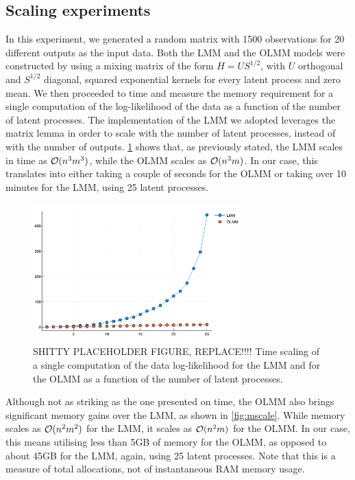 \documentclass{article}
\begin{document}
\subsection{Scaling experiments}
\label{subsec:scaling}

In this experiment, we generated a random matrix with 1500 observations for 20 different outputs as the input data.
Both the LMM and the OLMM models were constructed by using a mixing matrix of the form $H = U S^{1/2}$, with $U$ orthogonal and $S^{1/2}$ diagonal, squared exponential kernels for every latent process and zero mean.
We then proceeded to time and measure the memory requirement for a single computation of the log-likelihood of the data as a function of the number of latent processes.
The implementation of the LMM we adopted leverages the matrix lemma in order to scale with the number of latent processes, instead of with the number of outputs.
\cref{fig:tscale} shows that, as previously stated, the LMM scales in time as $\mathcal{O}(n^3m^3)$, while the OLMM scales as $\mathcal{O}(n^3m)$. 
In our case, this translates into either taking a couple of seconds for the OLMM or taking over 10 minutes for the LMM, using 25 latent processes.

\begin{figure}
    \centering
    \includegraphics[width=8cm]{timescaling.png}
    \caption{SHITTY PLACEHOLDER FIGURE, REPLACE!!!! Time scaling of a single computation of the data log-likelihood for the LMM and for the OLMM as a function of the number of latent processes.}
    \label{fig:tscale}
\end{figure}

Although not as striking as the one presented on time, the OLMM also brings significant memory gains over the LMM, as shown in \cref{fig:mscale}. 
While memory scales as $\mathcal{O}(n^2 m^2)$  for the LMM, it scales as $\mathcal{O}(n^2 m)$ for the OLMM.
In our case, this means utilising less than 5GB of memory for the OLMM, as opposed to about 45GB for the LMM, again, using 25 latent processes. 
Note that this is a measure of total allocations, not of instantaneous RAM memory usage.
\end{document}

